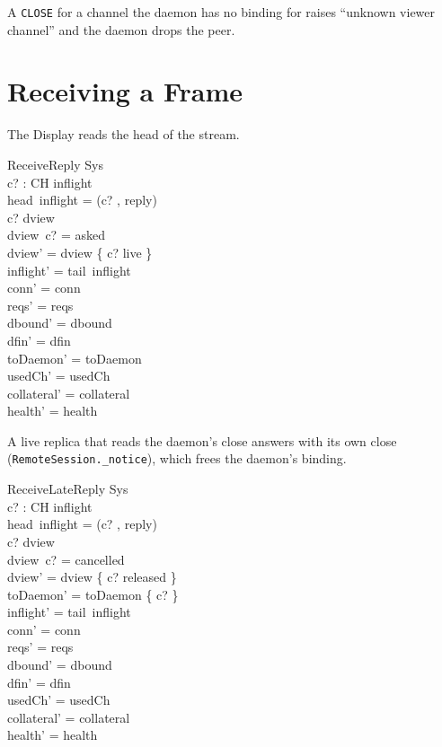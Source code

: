 \documentclass[a4paper,10pt,fleqn]{article}
\begin{document}
A \texttt{CLOSE} for a channel the daemon has no binding for raises
``unknown viewer channel'' and the daemon drops the peer.

\section{Receiving a Frame}

The Display reads the head of the stream.

\begin{schema}{ReceiveReply}
  \Delta Sys \\
  c? : CH
\where
  inflight \neq \langle \rangle \\
  head~inflight = (c? , reply) \\
  c? \in \dom dview \\
  dview~c? = asked \\
  dview' = dview \oplus \{ c? \mapsto live \} \\
  inflight' = tail~inflight \\
  conn' = conn \\
  reqs' = reqs \\
  dbound' = dbound \\
  dfin' = dfin \\
  toDaemon' = toDaemon \\
  usedCh' = usedCh \\
  collateral' = collateral \\
  health' = health
\end{schema}

A live replica that reads the daemon's close answers with its own close (\texttt{RemoteSession.\_notice}), which frees the daemon's binding.

\begin{schema}{ReceiveLateReply}
  \Delta Sys \\
  c? : CH
\where
  inflight \neq \langle \rangle \\
  head~inflight = (c? , reply) \\
  c? \in \dom dview \\
  dview~c? = cancelled \\
  dview' = dview \oplus \{ c? \mapsto released \} \\
  toDaemon' = toDaemon \cup \{ c? \} \\
  inflight' = tail~inflight \\
  conn' = conn \\
  reqs' = reqs \\
  dbound' = dbound \\
  dfin' = dfin \\
  usedCh' = usedCh \\
  collateral' = collateral \\
  health' = health
\end{schema}
\end{document}
